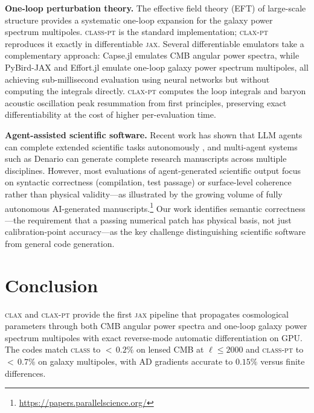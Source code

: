 \documentclass{article}
\newcommand{\clax}{\textsc{clax}\xspace}
\newcommand{\claxpt}{\textsc{clax-pt}\xspace}
\newcommand{\class}{\textsc{class}\xspace}
\newcommand{\classpt}{\textsc{class-pt}\xspace}
\newcommand{\jax}{\textsc{jax}\xspace}
\begin{document}
\textbf{One-loop perturbation theory.}
The effective field theory (EFT) of large-scale structure \citep{perko2016, damico2020} provides a systematic one-loop expansion for the galaxy power spectrum multipoles.
\classpt \citep{chudaykin2021} is the standard implementation; \claxpt reproduces it exactly in differentiable \jax.
Several differentiable emulators take a complementary approach: Capse.jl \citep{Bonici:2023xjk} emulates CMB angular power spectra, while PyBird-JAX \citep{Reeves:2025bxn} and Effort.jl \citep{Bonici:2025ltp} emulate one-loop galaxy power spectrum multipoles, all achieving sub-millisecond evaluation using neural networks but without computing the integrals directly.
\claxpt computes the loop integrals and baryon acoustic oscillation peak resummation \citep{senatore2015, vlah2015} from first principles, preserving exact differentiability at the cost of higher per-evaluation time.

\textbf{Agent-assisted scientific software.}
Recent work has shown that LLM agents can complete extended scientific tasks autonomously \citep{carlini2026}, and multi-agent systems such as Denario \citep{villaescusa2025} can generate complete research manuscripts across multiple disciplines.
However, most evaluations of agent-generated scientific output focus on syntactic correctness (compilation, test passage) or surface-level coherence rather than physical validity---as illustrated by the growing volume of fully autonomous AI-generated manuscripts.\footnote{\url{https://papers.parallelscience.org/}}
Our work identifies semantic correctness---the requirement that a passing numerical patch has physical basis, not just calibration-point accuracy---as the key challenge distinguishing scientific software from general code generation.

\section{Conclusion}
\label{sec:conclusion}

\clax and \claxpt provide the first \jax pipeline that propagates cosmological parameters through both CMB angular power spectra and one-loop galaxy power spectrum multipoles with exact reverse-mode automatic differentiation on GPU.
The codes match \class to ${<}\,0.2\%$ on lensed CMB at $\ell \leq 2000$ and \classpt to ${<}\,0.7\%$ on galaxy multipoles, with AD gradients accurate to $0.15\%$ versus finite differences.
\end{document}
